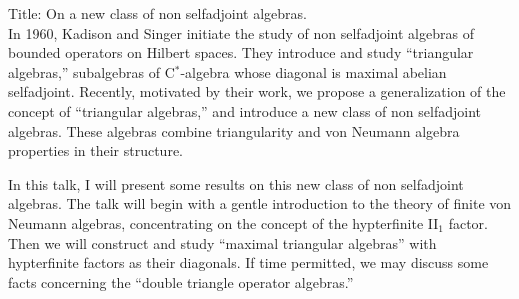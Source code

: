 \documentclass{amsart}
\begin{document}
Title: On a new class of non selfadjoint algebras.\\


In 1960, Kadison and Singer initiate the study of non selfadjoint
algebras of bounded operators on Hilbert spaces. They introduce 
and study ``triangular algebras,'' subalgebras of C$^*$-algebra whose
diagonal is maximal abelian selfadjoint. Recently, motivated by
their work, we propose a generalization of the concept of ``triangular 
algebras,'' and introduce a new class of non selfadjoint algebras. These
algebras combine triangularity and von Neumann algebra properties in their
structure.

In this talk, I will present some results on this new class of non selfadjoint
algebras. The talk will begin with a gentle introduction to the 
theory of finite von Neumann algebras, concentrating on the
concept of the hypterfinite II$_1$ factor. Then we will construct and study
``maximal triangular algebras'' with hypterfinite factors as their diagonals. 
If time permitted, we may discuss some facts concerning the ``double triangle
operator algebras.''
\end{document}
